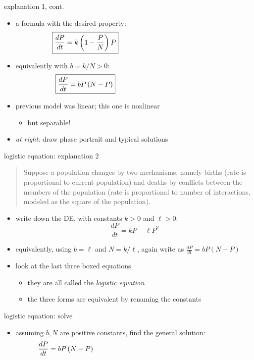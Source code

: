 \documentclass{beamer}
\begin{document}
\begin{frame}{explanation 1, cont.}

\begin{itemize}
\item a formula with the desired property:
    $$\boxed{\frac{dP}{dt} = k \left(1-\frac{P}{N}\right) P} \hspace{50mm}$$
\item equivalently with $b=k/N >0$:
    $$\boxed{\frac{dP}{dt} = b P \left(N-P\right)} \hspace{50mm}$$
\item previous model was linear; this one is nonlinear
     \begin{itemize}
     \item but separable!
     \end{itemize}
\item \emph{at right:} draw phase portrait and typical solutions
\end{itemize}
\end{frame}


\begin{frame}{logistic equation: explanation 2}

\small
\begin{quotation}
\noindent Suppose a population changes by two mechanisms, namely births (rate is proportional to current population) and deaths by conflicts between the members of the population (rate is proportional to number of interactions, modeled as the square of the population).
\end{quotation}

\normalsize
\begin{itemize}
\item write down the DE, with constants $k>0$ and $\ell>0$:
    $$\boxed{\frac{dP}{dt} = k P - \ell P^2}$$
\item equivalently, using $b=\ell$ and $N=k/\ell$, again write as $\frac{dP}{dt} = b P \left(N-P\right)$
\item look at the last three boxed equations
    \begin{itemize}
    \item they are all called the \emph{logistic equation}
    \item the three forms are equivalent by renaming the constants
    \end{itemize}
\end{itemize}
\end{frame}


\begin{frame}{logistic equation: solve}

\begin{itemize}
\item assuming $b,N$ are positive constants, find the general solution:
    $$\frac{dP}{dt} = b P \left(N-P\right) \hspace{70mm}$$
\end{itemize}

\vspace{50mm}
\end{frame}
\end{document}
